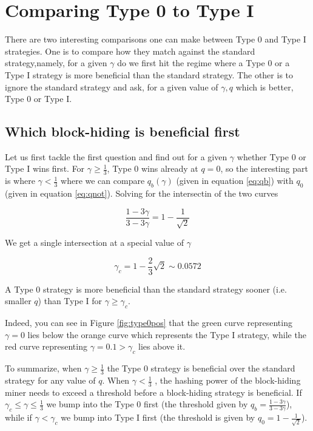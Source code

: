 \documentclass[letterpaper,12pt]{report}
\theoremstyle{plain}
\theoremstyle{definition}
\begin{document}
\section{Comparing Type 0 to Type I}

There are two interesting comparisons one can make between Type 0 and Type I strategies.
One is to compare how they match against the standard strategy,namely, for a given $\gamma$ do we first hit the regime where a Type 0 or a Type I strategy is more beneficial than the standard strategy.
The other is to ignore the standard strategy and ask, for a given value of $\gamma, q$ which is better, Type 0 or Type I.

\subsection{Which block-hiding is beneficial first}
Let us first tackle the first question and find out for a given $\gamma$ whether Type 0 or Type I wins first.
For $\gamma\geq\frac{1}{3}$, Type 0 wins already at $q=0$, so the interesting part is where $\gamma < \frac{1}{3}$ where we can compare $q_b(\gamma)$ (given in equation \ref{eq:qb}) with $q_0$ (given in equation \ref{eq:qnot}). Solving for the intersectin of the two curves

\begin{equation}\label{eq:qbornot}
\dfrac{1-3\gamma}{3-3\gamma}=1-\dfrac{1}{\sqrt{2}}
\end{equation}

We get a single intersection at a special value of $\gamma$

\begin{equation}\label{gamma0before1}
\gamma_c=1-\frac{2}{3}\sqrt{2}\sim 0.0572
\end{equation}

A Type 0 strategy is more beneficial than the standard strategy sooner (i.e. smaller $q$) than Type I for $\gamma \geq\gamma_c$.

Indeed, you can see in Figure \ref{fig:type0pos} that the green curve representing $\gamma=0$ lies below the orange curve which represents the Type I strategy, while the red curve representing $\gamma=0.1>\gamma_c$ lies above it.

To summarize, when $\gamma\geq\frac{1}{3}$ the Type 0 strategy is beneficial over the standard strategy for any value of $q$. When $\gamma<\frac{1}{3}$ , the hashing power of the block-hiding miner needs to exceed a threshold before a block-hiding strategy is beneficial. If $\gamma_c\leq\gamma\leq\frac{1}{3}$ we bump into the Type 0 first (the threshold given by $q_b=\frac{1-3\gamma}{3-3\gamma}$), while if $\gamma<\gamma_c$ we bump into Type I first (the threshold is given by $q_0=1-\frac{1}{\sqrt{2}}$).
\end{document}
